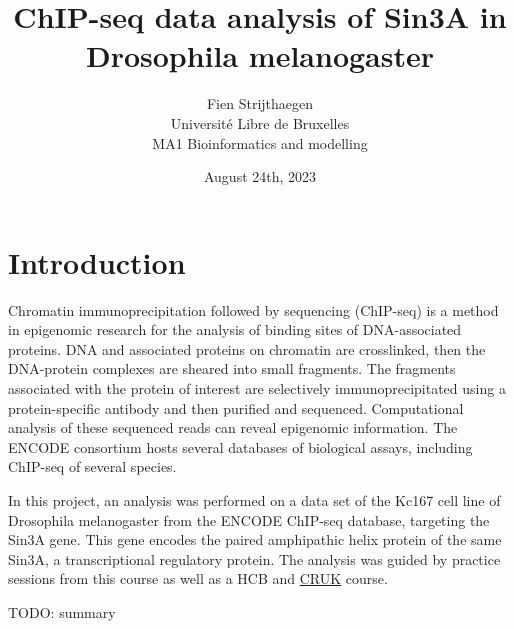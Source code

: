 \documentclass{article}
\begin{document}
\title{ChIP-seq data analysis of Sin3A in Drosophila melanogaster}
\author{Fien Strijthaegen
\\Université Libre de Bruxelles
\\MA1 Bioinformatics and modelling}
\date{August 24th, 2023}
\maketitle

\section{Introduction}

Chromatin immunoprecipitation followed by sequencing (ChIP-seq) is a method in epigenomic research for the analysis of binding sites of DNA-associated proteins. DNA and associated proteins on chromatin are crosslinked, then the DNA-protein complexes are sheared into small fragments. The fragments associated with the protein of interest are selectively immunoprecipitated using a protein-specific antibody and then purified and sequenced. Computational analysis of these sequenced reads can reveal epigenomic information\cite{nakato2021methods}. The ENCODE consortium\cite{de2012encode} hosts several databases of biological assays, including ChIP-seq of several species. 

In this project, an analysis was performed on a data set of the Kc167 cell line of Drosophila melanogaster from the ENCODE ChIP-seq database, targeting the Sin3A gene. This gene encodes the paired amphipathic helix protein of the same Sin3A, a transcriptional regulatory protein. The analysis was guided by practice sessions from this course as well as a HCB \cite{meeta2023hbctraining} and \href{https://bioinformatics-core-shared-training.github.io/cruk-summer-school-2021/ChIPSeq/practicals/ChIP_Practical3_DownstreamAnalysis_2021.html}{CRUK} course.

TODO: summary
\end{document}
